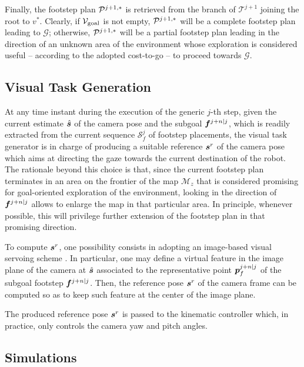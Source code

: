Finally, the footstep plan ${\cal P}^{j+1,*}$ is retrieved from the branch of $\mathcal{T}^{j+1}$ joining the root to $v^*$. 
Clearly, if ${\cal V}_{\rm goal}$ is not empty, ${\cal P}^{j+1,*}$ will be a complete footstep plan leading to $\mathcal{G}$; otherwise, ${\cal P}^{j+1,*}$ will be a partial footstep plan leading in the direction of an unknown area of the environment whose exploration is considered useful -- according to the adopted cost-to-go -- to proceed towards $\mathcal{G}$. 


\subsection{Visual Task Generation}
\label{sec:onlineCase:VisualTaskGeneration}

At any time instant during the execution of the generic $j$-th step, given the current estimate $\hat{{\bm{s}}}$ of the camera pose and the subgoal ${\bm{f}}^{j+n|j}$, which is readily extracted from the current sequence $\mathcal{S}_f^j$ of footstep placements, the visual task generator is in charge of producing a suitable reference ${\bm{s}}^r$ of the camera pose which aims at directing the gaze towards the current destination of the robot. 
The rationale beyond this choice is that, since the current footstep plan terminates in an area on the frontier of the map $\mathcal{M}_z$ that is considered promising for goal-oriented exploration of the environment, looking in the direction of ${\bm{f}}^{j+n|j}$ allows to enlarge the map in that particular area. In principle, whenever possible, this will privilege further extension of the footstep plan in that promising direction.

To compute ${\bm{s}}^r$, one possibility consists in adopting an image-based visual servoing scheme \cite{ChHuCo:16}. 
In particular, one may define a virtual feature in the image plane of the camera at $\hat{{\bm{s}}}$ associated to the representative point ${\bm{p}}_f^{j+n|j}$ of the subgoal footstep ${\bm{f}}^{j+n|j}$.
Then, the reference pose ${\bm{s}}^r$ of the camera frame can be computed so as to keep such feature at the center of the image plane.

The produced reference pose ${\bm{s}}^r$ is passed to the kinematic controller which, in practice, only controls the camera yaw and pitch angles.


\subsection{Simulations}
\label{sec:onlineCase:Simulations}

